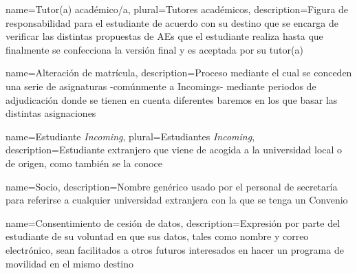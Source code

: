 {
	name=Tutor(a) académico/a,
	plural=Tutores académicos,
	description={Figura de responsabilidad para el estudiante de acuerdo con su destino que se encarga de verificar las distintas propuestas de \glspl{AE} que el estudiante realiza hasta que finalmente se confecciona la versión final y es aceptada por su tutor(a)}
}

{
	name=Alteración de matrícula,
	description={Proceso mediante el cual se conceden una serie de asignaturas -comúnmente a \glspl{Incoming}- mediante periodos de adjudicación donde se tienen en cuenta diferentes baremos en los que basar las distintas asignaciones}
}

{
	name=Estudiante \textit{Incoming},
	plural=Estudiantes \textit{Incoming},
	description={Estudiante extranjero que viene de acogida a la universidad local o de origen, como también se la conoce}
}

{
	name=Socio,
	description={Nombre genérico usado por el personal de secretaría para referirse a cualquier universidad extranjera con la que se tenga un \gls{Convenio}}
}

{
	name=Consentimiento de cesión de datos,
	description={Expresión por parte del estudiante de su voluntad en que sus datos, tales como nombre y correo electrónico, sean facilitados a otros futuros interesados en hacer un programa de movilidad en el mismo destino}
}

\glsaddall
